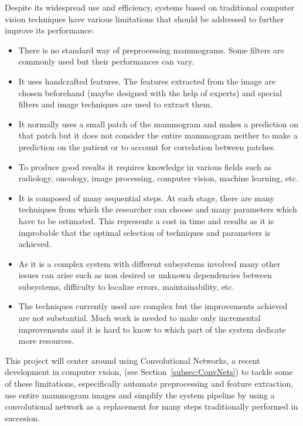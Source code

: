 Despite its widespread use and efficiency, systems based on traditional computer vision techniques have various limitations that should be addressed to further improve its performance:
\begin{itemize}
	\item There is no standard way of preprocessing mammograms. Some filters are commonly used but their performances can vary.
	\item It uses handcrafted features. The features extracted from the image are chosen beforehand (maybe designed with the help of experts) and special filters and image techniques are used to extract them.
	\item It normally uses a small patch of the mammogram and makes a prediction on that patch but it does not consider the entire mammogram neither to make a prediction on the patient or to account for correlation between patches.
	\item To produce good results it requires knowledge in various fields such as radiology, oncology, image processing, computer vision, machine learning, etc.
	\item It is composed of many sequential steps. At each stage, there are many techniques from which the researcher can choose and many parameters which have to be estimated. This represents a cost in time and results as it is improbable that the optimal selection of techniques and parameters is achieved.
	\item As it is a complex system with different subsystems involved many other issues can arise such as non desired or unknown dependencies between subsystems, difficulty to localize errors, maintainability, etc.  
	\item The techniques currently used are complex but the improvements achieved are not substantial. Much work is needed to make only incremental improvements and it is hard to know to which part of the system dedicate more resources.
\end{itemize}

This project will center around using Convolutional Networks, a recent development in computer vision, (see Section~\ref{subsec:ConvNets}) to tackle some of these limitations, especifically automate preprocessing and feature extraction, use entire mammogram images and simplify the system pipeline by using a convolutional network as a replacement for many steps traditionally performed in succesion.

